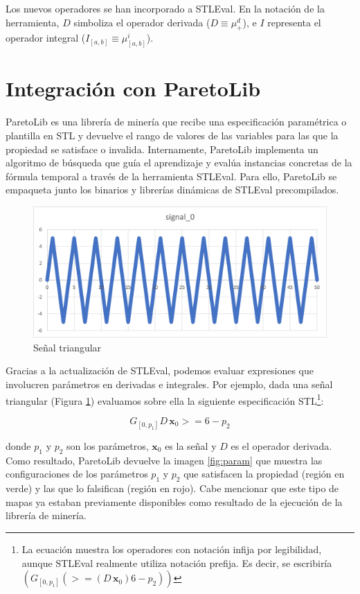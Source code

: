 Los nuevos operadores se han incorporado a STLEval. En la notación de la herramienta, $D$ simboliza el operador derivada ($D \equiv \mu^d_{+}$), e $I$ representa el operador integral ($I_[a,b] \equiv \mu^i_{[a,b]}$).

\section{Integración con ParetoLib}
ParetoLib \cite{FORMATS_19, ParetoLib} es una librería de minería que recibe una especificación paramétrica o plantilla en STL y devuelve el rango de valores de las variables para las que la propiedad se satisface o invalida. Internamente, ParetoLib implementa un algoritmo de búsqueda que guía el aprendizaje y evalúa instancias concretas de la fórmula temporal a través de la herramienta STLEval. Para ello, ParetoLib se empaqueta junto los binarios y librerías dinámicas de STLEval precompilados.


\begin{figure}[htb]
\centering
  \includegraphics[width=0.7\linewidth]{images/triangular} 
\caption{Señal triangular}
\label{fig:trian}
\end{figure}

Gracias a la actualización de STLEval, podemos evaluar expresiones que involucren parámetros en derivadas e integrales. Por ejemplo, dada una señal triangular (Figura \ref{fig:trian}) evaluamos sobre ella la siguiente especificación STL\footnote{La ecuación muestra los operadores con notación infija por legibilidad, aunque STLEval realmente utiliza notación prefija. Es decir, se escribiría $(G_{[0,p_1]} (>= (D\, \mathbf{x}_0) 6 - p_2))$}:


$$G_{[0,p_1]} D\, \mathbf{x}_0 >= 6 - p_2$$ 

donde $p_1$ y $p_2$ son los parámetros, $\mathbf{x}_0$ es la señal y $D$ es el operador derivada.
Como resultado, ParetoLib devuelve la imagen \ref{fig:param} que muestra las configuraciones de los parámetros $p_1$ y $p_2$ que satisfacen la propiedad (región en verde) y las que lo falsifican (región en rojo). %
Cabe mencionar que este tipo de mapas ya estaban previamente disponibles como resultado de la ejecución de la librería de minería.

